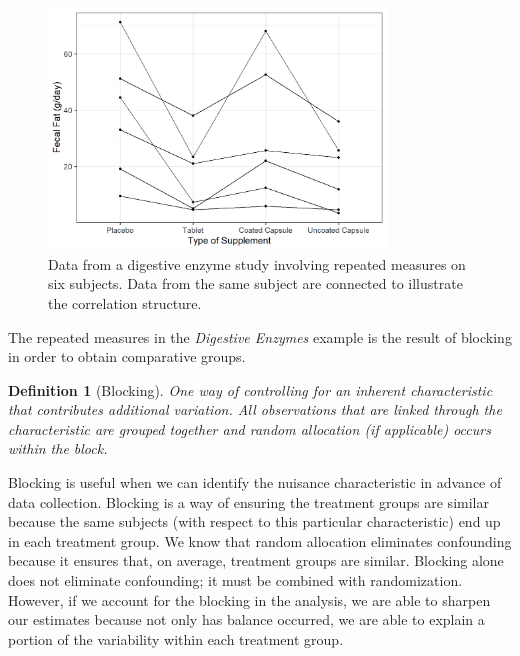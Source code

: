 \documentclass[
]{book}
\theoremstyle{plain}
\theoremstyle{mydefn}
\newtheorem{definition}{Definition}[chapter]
\theoremstyle{myexmpl}
\theoremstyle{remark}
\begin{document}
\begin{figure}

{\centering \includegraphics[width=0.8\textwidth]{./Images/rm-terminology-enzyme-plot-extended-1} 

}

\caption{Data from a digestive enzyme study involving repeated measures on six subjects.  Data from the same subject are connected to illustrate the correlation structure.}\label{fig:rm-terminology-enzyme-plot-extended}
\end{figure}

The repeated measures in the \emph{Digestive Enzymes} example is the result of blocking in order to obtain comparative groups.

\begin{definition}[Blocking]
One way of controlling for an inherent characteristic that contributes additional variation. All observations that are linked through the characteristic are grouped together and random allocation (if applicable) occurs within the block.
\end{definition}

Blocking is useful when we can identify the nuisance characteristic in advance of data collection. Blocking is a way of ensuring the treatment groups are similar because the same subjects (with respect to this particular characteristic) end up in each treatment group. We know that random allocation eliminates confounding because it ensures that, on average, treatment groups are similar. Blocking alone does not eliminate confounding; it must be combined with randomization. However, if we account for the blocking in the analysis, we are able to sharpen our estimates because not only has balance occurred, we are able to explain a portion of the variability within each treatment group.
\end{document}
